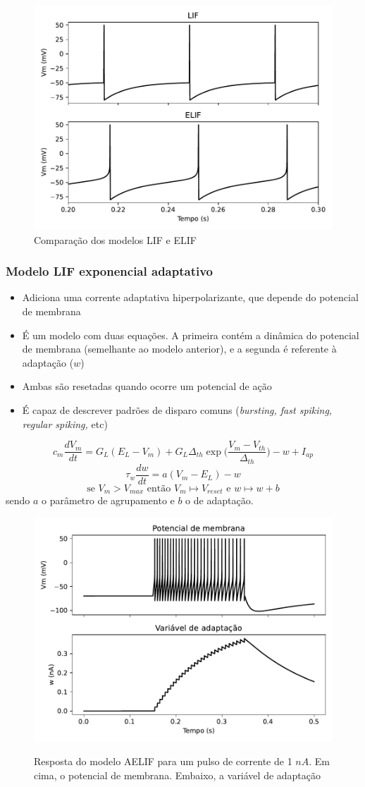 \begin{figure}[htb!]
	\centering
	\caption{Comparação dos modelos LIF e ELIF}
	\label{fig:elif}
	\includegraphics[width=0.7\linewidth]{figs/elif}
\end{figure}


\subsubsection{Modelo LIF exponencial adaptativo}
\begin{itemize}
	\item Adiciona uma corrente adaptativa hiperpolarizante, que depende do potencial de membrana
	\item É um modelo com duas equações. A primeira contém a dinâmica do potencial de membrana (semelhante ao modelo anterior), e a segunda é referente à adaptação ($w$)
	\item Ambas são resetadas quando ocorre um potencial de ação
	\item É capaz de descrever padrões de disparo comuns (\textit{bursting, fast spiking, regular spiking,} etc)
\end{itemize}
$$
c_m\frac{dV_m}{dt} = G_L(E_L-V_m) + G_L\Delta_{th}\exp\Big(\frac{V_m-V_{th}}{\Delta_{th}}\Big) - w + I_{ap}
$$$$
\tau_w\frac{dw}{dt}=a(V_m-E_L)-w
$$$$
\text{se } V_m > V_{max} \text{ então } V_m\mapsto V_{reset} \text{ e } w\mapsto w + b
$$
sendo $a$ o parâmetro de agrupamento e $b$ o de adaptação.

\begin{figure}[h!]
	\centering
	\caption[Resposta do modelo AELIF]{Resposta do modelo AELIF para um pulso de corrente de 1 $nA$. Em cima, o potencial de membrana. Embaixo, a variável de adaptação}
	\label{fig:adexrs}
	\includegraphics[width=0.7\linewidth]{figs/aelif}\\
\end{figure}



